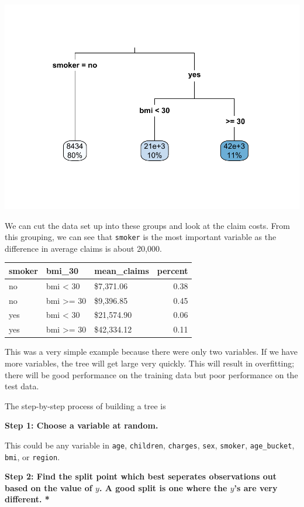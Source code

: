 \documentclass[openany]{book}
\begin{document}
\includegraphics{06-tree-based-models_files/figure-latex/unnamed-chunk-2-1.pdf}

We can cut the data set up into these groups and look at the claim costs. From this grouping, we can see that \texttt{smoker} is the most important variable as the difference in average claims is about 20,000.

\begin{longtable}[]{@{}lllr@{}}
\toprule
smoker & bmi\_30 & mean\_claims & percent\tabularnewline
\midrule
\endhead
no & bmi \textless{} 30 & \$7,371.06 & 0.38\tabularnewline
no & bmi \textgreater= 30 & \$9,396.85 & 0.45\tabularnewline
yes & bmi \textless{} 30 & \$21,574.90 & 0.06\tabularnewline
yes & bmi \textgreater= 30 & \$42,334.12 & 0.11\tabularnewline
\bottomrule
\end{longtable}

This was a very simple example because there were only two variables. If we have more variables, the tree will get large very quickly. This will result in overfitting; there will be good performance on the training data but poor performance on the test data.

The step-by-step process of building a tree is

\textbf{Step 1: Choose a variable at random.}

This could be any variable in \texttt{age}, \texttt{children}, \texttt{charges}, \texttt{sex}, \texttt{smoker}, \texttt{age\_bucket}, \texttt{bmi}, or \texttt{region}.

\textbf{Step 2: Find the split point which best seperates observations out based on the value of \(y\). A good split is one where the \(y\)'s are very different. * }
\end{document}
